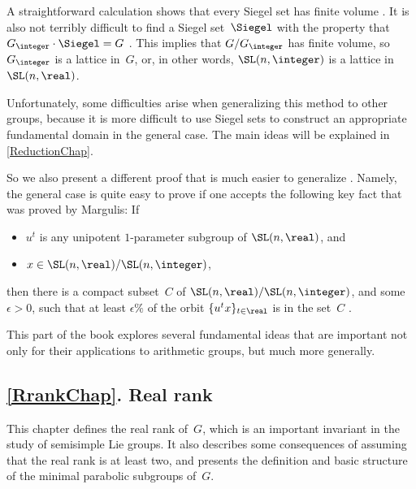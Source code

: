 A straightforward calculation shows that every Siegel set has finite volume . It is also not terribly difficult to find a Siegel set~$\Siegel$ with the property that $G_\integer  \cdot \Siegel = G$ . This implies that $G/G_\integer$ has finite volume, so $G_\integer$ is a lattice in~$G$, or, in other words, $\SL(n,\integer)$ is a lattice in $\SL(n,\real)$.

Unfortunately, some difficulties arise when generalizing this method to other groups, because it is more difficult to use Siegel sets to construct an appropriate fundamental domain in the general case. The main ideas will be explained in \cref{ReductionChap}.

\smallbreak

So we also present a different proof that is much easier to generalize . Namely, the general case is quite easy to prove if one accepts the following key fact that was proved by Margulis: If 
	\begin{itemize}
	\item $u^t$ is any unipotent $1$-parameter subgroup of\/ $\SL(n,\real)$,
	and
	\item $x \in \SL(n,\real)/\SL(n,\integer)$,
	\end{itemize}
then there is a compact subset~$C$ of\/ $\SL(n,\real)/\SL(n,\integer)$, and some $\epsilon > 0$, such that at least $\epsilon \%$ of the orbit $\{u^t x\}_{t \in \real}$ is in the set~$C$ .





This part of the book explores several fundamental ideas that are important not only for their applications to arithmetic groups, but much more generally.


\smallbreak

\subsection*{\cref{RrankChap}.  Real rank}
This chapter defines the real rank of~$G$, which is an important invariant in the study of semisimple Lie groups. It also describes some consequences of assuming that the real rank is at least two, and presents the definition and basic structure of the minimal parabolic subgroups of~$G$.




\smallbreak

